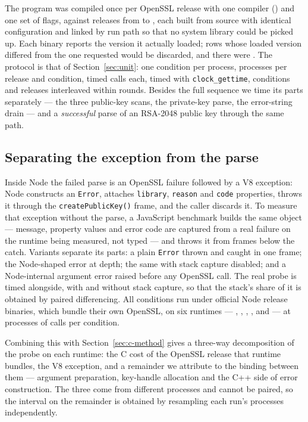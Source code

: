 \documentclass[pdflatex,sn-basic,twocolumn]{sn-jnl}%
\begin{document}
The program was compiled once per OpenSSL release with one compiler
(\CProbeCompiler) and one set of flags, against \CProbeVersionCount{} releases
from \CProbeVersionFirst{} to \CProbeVersionLast{}, each built from source with
identical configuration and linked by run path so that no system library could
be picked up. Each binary reports the version it actually loaded; rows whose
loaded version differed from the one requested would be discarded, and there
were \CProbeIdentityMismatches. The protocol is that of
Section~\ref{sec:unit}: one condition per process, \CProbeInvocations{}
processes per release and condition, \CProbeCallsPerInvocation{} timed calls
each, timed with \texttt{clock\_gettime}, conditions and releases interleaved
within rounds. Besides the full sequence we time its parts separately --- the
three public-key scans, the private-key parse, the error-string drain --- and a
\emph{successful} parse of an RSA-2048 public key through the same path.

\subsection{Separating the exception from the parse}\label{sec:exc-method}

Inside Node the failed parse is an OpenSSL failure followed by a V8 exception:
Node constructs an \texttt{Error}, attaches \texttt{library}, \texttt{reason}
and \texttt{code} properties, throws it through the \texttt{createPublicKey()}
frame, and the caller discards it. To measure that exception without the
parse, a JavaScript benchmark builds the same object --- message, property
values and error code are captured from a real failure on the runtime being
measured, not typed --- and throws it from \ExcDepth{} frames below the catch.
Variants separate its parts: a plain \texttt{Error} thrown and caught in one
frame; the Node-shaped error at depth; the same with stack capture disabled;
and a Node-internal argument error raised before any OpenSSL call. The real
probe is timed alongside, with and without stack capture, so that the stack's
share of it is obtained by paired differencing. All conditions run under
official Node release binaries, which bundle their own OpenSSL, on six
runtimes --- \RtEighteenLiteral, \RtTwentyLiteral, \RtTwentyTwoLiteral,
\RtTwentyThreeLiteral, \RtTwentyFourLiteral{} and \RtTwentySixLiteral{} --- at
\ExcInvocations{} processes of \ExcCallsPerInvocation{} calls per condition.

Combining this with Section~\ref{sec:c-method} gives a three-way decomposition
of the probe on each runtime: the C cost of the OpenSSL release that runtime
bundles, the V8 exception, and a remainder we attribute to the binding between
them --- argument preparation, key-handle allocation and the C++ side of error
construction. The three come from different processes and cannot be paired, so
the interval on the remainder is obtained by resampling each run's processes
independently.
\end{document}
